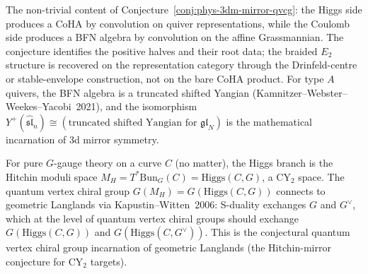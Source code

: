 The non-trivial content of Conjecture~\ref{conj:phys-3dm-mirror-qvcg}: the Higgs side produces a CoHA by convolution on quiver representations, while the Coulomb side produces a BFN algebra by convolution on the affine Grassmannian. The conjecture identifies the positive halves and their root data; the braided \(E_2\) structure is recovered on the representation category through the Drinfeld-centre or stable-envelope construction, not on the bare CoHA product. For type $A$ quivers, the BFN algebra is a truncated shifted Yangian (Kamnitzer--Webster--Weekes--Yacobi~2021), and the isomorphism $Y^+(\widehat{\mathfrak{sl}}_n) \cong (\text{truncated shifted Yangian for } \mathfrak{gl}_N)$ is the mathematical incarnation of 3d mirror symmetry.

\begin{remark}
\label{rem:phys-3dm-hitchin}
For pure $G$-gauge theory on a curve $C$ (no matter), the Higgs branch is the Hitchin moduli space $M_H = T^*\mathrm{Bun}_G(C) = \mathrm{Higgs}(C,G)$, a $\mathrm{CY}_2$ space. The quantum vertex chiral group $G(M_H) = G(\mathrm{Higgs}(C,G))$ connects to geometric Langlands via Kapustin--Witten~2006: S-duality exchanges $G$ and $G^\vee$, which at the level of quantum vertex chiral groups should exchange $G(\mathrm{Higgs}(C,G))$ and $G(\mathrm{Higgs}(C,G^\vee))$. This is the conjectural quantum vertex chiral group incarnation of geometric Langlands (the Hitchin-mirror conjecture for $\mathrm{CY}_2$ targets).
\end{remark}
